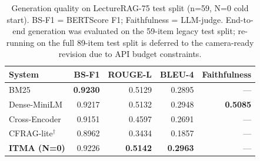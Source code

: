 \begin{table}[!htbp]
\centering
\small
\caption{Generation quality on LectureRAG-75 test split (n=59, N=0
cold start).  BS-F1 = BERTScore F1; Faithfulness = LLM-judge.
End-to-end generation was evaluated on the 59-item legacy test split;
re-running on the full 89-item test split is deferred to the
camera-ready revision due to API budget constraints.}
\label{tab:gen_quality}
\begin{tabular}{lrrrr}
\toprule
System & BS-F1 & ROUGE-L & BLEU-4 & Faithfulness \\
\midrule
BM25 & \textbf{0.9230} & 0.5129 & 0.2895 & --- \\
Dense-MiniLM & 0.9217 & 0.5132 & 0.2948 & \textbf{0.5085} \\
Cross-Encoder & 0.9151 & 0.4597 & 0.2691 & --- \\
CFRAG-lite$^\dagger$ & 0.8962 & 0.3434 & 0.1857 & --- \\
\textbf{ITMA (N=0)} & 0.9226 & \textbf{0.5142} & \textbf{0.2963} & --- \\
\bottomrule
\end{tabular}
\end{table}
